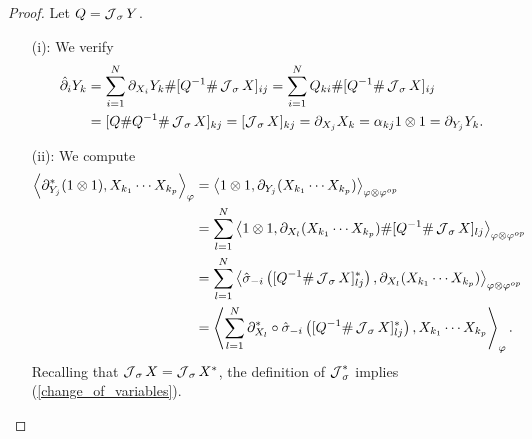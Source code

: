 \begin{proof}
Let $Q=\operatorname{\mathcal J}_\sigma Y$.
	\begin{enumerate}
	\item[(i):] We verify
		\begin{align*}
			\hat{\partial}_iY_k&=\sum_{i=1}^N \partial_{X_i}Y_k\#[Q^{-1}\# \operatorname{\mathcal J}_\sigma X]_{ij}=\sum_{i=1}^N Q_{ki}\#[Q^{-1}\#\operatorname{\mathcal J}_\sigma X]_{ij}\\
				&=[Q\#Q^{-1}\#\operatorname{\mathcal J}_\sigma X]_{kj}=[\operatorname{\mathcal J}_\sigma X]_{kj}=\partial_{X_j}X_k=\alpha_{kj}1\otimes 1=\partial_{Y_j}Y_k.
		\end{align*}
		
	\item[(ii):] We compute
		\begin{align*}
			\left\langle\partial_{Y_j}^*(1\otimes 1), X_{k_1}\cdots X_{k_p}\right\rangle_\varphi &= \left\langle1\otimes 1, \partial_{Y_j}(X_{k_1}\cdots X_{k_p})\right\rangle_{\varphi\otimes\varphi^{op}}\\
							&=\sum_{l=1}^N \left\langle1\otimes 1, \partial_{X_l}(X_{k_1}\cdots X_{k_p})\#[Q^{-1}\#\operatorname{\mathcal J}_\sigma X]_{lj}\right\rangle_{\varphi\otimes\varphi^{op}}\\
							&=\sum_{l=1}^N \left\langle\hat{\sigma}_{-i}\left([Q^{-1}\# \operatorname{\mathcal J}_\sigma X]_{lj}^*\right), \partial_{X_l}(X_{k_1}\cdots X_{k_p})\right\rangle_{\varphi\otimes\varphi^{op}}\\
							&=\left\langle \sum_{l=1}^N \partial_{X_l}^*\circ \hat{\sigma}_{-i}\left([Q^{-1}\# \operatorname{\mathcal J}_\sigma X]_{lj}^*\right),X_{k_1}\cdots X_{k_p}\right\rangle_\varphi.
		\end{align*}
		 Recalling that $\operatorname{\mathcal J}_\sigma X=\operatorname{\mathcal J}_\sigma X^*$, the definition of $\operatorname{\mathcal J}_\sigma^*$ implies (\ref{change_of_variables}).
		 

\end{enumerate}
\end{proof}
